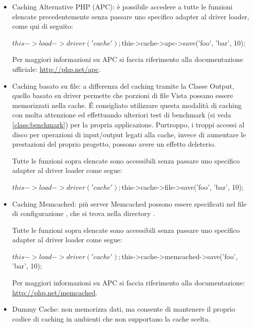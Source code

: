 \begin{itemize}
\item Caching Alternative PHP (APC): è possibile accedere a tutte le funzioni elencate precedentemente senza passare uno specifico adapter al driver loader, come qui di seguito:

\begin{code}
$this->load->driver('cache');
$this->cache->apc->save('foo', 'bar', 10);
\end{code}

Per maggiori informazioni su \ac{APC} si faccia riferimento alla documentazione ufficiale: \url{http://php.net/apc}.

\item Caching basato su file: a differenza del caching tramite la Classe Output, quello basato su driver permette che porzioni di file Vista possano essere memorizzati nella cache. \'E consigliato utilizzare questa modalità di caching con molta attenzione ed effettuando ulteriori test di benchmark (si veda \vref{class:benchmark}) per la propria applicazione. Purtroppo, i troppi accessi al disco per operazioni di input/output legati alla cache, invece di aumentare le prestazioni del proprio progetto, possono avere un effetto deleterio.

Tutte le funzioni sopra elencate sono accessibili senza passare uno specifico adapter al driver loader come segue:

\begin{code}
$this->load->driver('cache');
$this->cache->file->save('foo', 'bar', 10);
\end{code}

\item Caching Memcached: più server Memcached possono essere specificati nel file di configurazione , che si trova nella directory .

Tutte le funzioni sopra elencate sono accessibili senza passare uno specifico adapter al driver loader come segue:

\begin{code}
$this->load->driver('cache');
$this->cache->memcached->save('foo', 'bar', 10);
\end{code}

Per maggiori informazioni su APC si faccia riferimento alla documentazione: \url{http://php.net/memcached}.

\item Dummy Cache: non memorizza dati, ma consente di mantenere il proprio codice di caching in ambienti che non supportano la cache scelta.
\end{itemize}